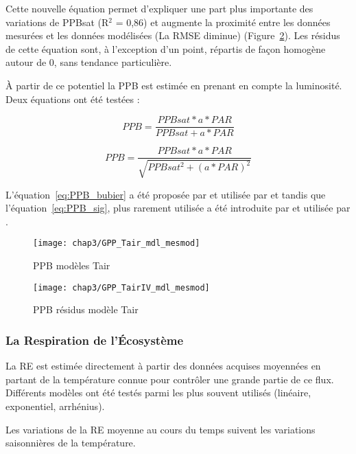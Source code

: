 Cette nouvelle équation permet d'expliquer une part plus importante des variations de PPBsat (R$^{2}$ = 0,86) et augmente la proximité entre les données mesurées et les données modélisées (La RMSE diminue) (Figure~\ref{fig:PPB_TairIV_mdl}).
Les résidus de cette équation sont, à l'exception d'un point, répartis de façon homogène autour de 0, sans tendance particulière.

À partir de ce potentiel la PPB est estimée en prenant en compte la luminosité.
Deux équations ont été testées :

\begin{equation} \label{eq:PPB_bubier}
PPB = \frac{PPBsat * a * PAR}{PPBsat + a * PAR}
\end{equation}

\begin{equation} \label{eq:PPB_sig}
PPB = \frac{PPBsat * a * PAR}{\sqrt{PPBsat^2 + (a * PAR)^2}}
\end{equation}

L'équation~\ref{eq:PPB_bubier} a été proposée par \cite{bubier1998} et utilisée par \cite{bortoluzzi2006,worrall2009} et tandis que l'équation~\ref{eq:PPB_sig}, plus rarement utilisée a été introduite par \cite{smith1937} et utilisée par \cite{wohlfahrt2010,gorres2014}.


\begin{figure}
\centering
\texttt{[image: chap3/GPP\_Tair\_mdl\_mesmod]}
\caption{PPB modèles Tair}
\label{fig:PPB_Tair_mdl}
\end{figure}

\begin{figure}
\centering
\texttt{[image: chap3/GPP\_TairIV\_mdl\_mesmod]}
\caption{PPB résidus modèle Tair}
\label{fig:PPB_TairIV_mdl}
\end{figure}

\subsubsection{La Respiration de l'Écosystème}


La RE est estimée directement à partir des données acquises moyennées en partant de la température connue pour contrôler une grande partie de ce flux.
Différents modèles ont été testés parmi les plus souvent utilisés (linéaire, exponentiel, arrhénius).


Les variations de la RE moyenne au cours du temps suivent les variations saisonnières de la température.

